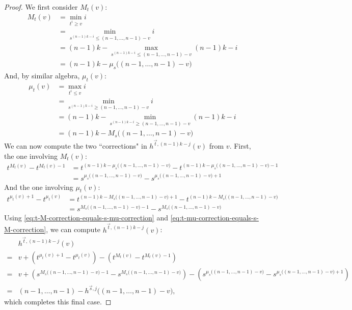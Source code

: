 \documentclass[11pt]{article}
\begin{document}
\begin{proof}
    We first consider $M_t(v)$:
    \begin{align}
        M_t(v) &= \min_{t^i \geq v} i \\
        &= \min_{s^{(n-1)k-i} \leq (n-1, \ldots, n-1) - v} i \\
        &= (n-1)k - \max_{s^{(n-1)k - i} \leq (n-1, \ldots, n-1) - v} (n-1)k - i \\
        &= (n-1)k - \mu_s\bigl((n-1, \ldots, n-1) - v\bigr)
    \end{align}
    And, by similar algebra, $\mu_t(v)$:
    \begin{align}
        \mu_t(v) &= \max_{t^i \leq v} i \\
        &= \min_{s^{(n-1)k-i} \geq (n-1, \ldots, n-1) - v} i \\
        &= (n-1)k - \min_{s^{(n-1)k - i} \geq (n-1, \ldots, n-1) - v} (n-1)k - i \\
        &= (n-1)k - M_s\bigl((n-1, \ldots, n-1) - v\bigr)
    \end{align}
    We can now compute the two ``corrections" in $h^{\vec{t}, (n-1)k-j}(v)$ from $v$. First, the one involving $M_t(v)$:
    \begin{align}
        t^{M_t(v)} - t^{M_t(v)-1} &= t^{(n-1)k - \mu_s\bigl((n-1, \ldots, n-1) - v\bigr)} - t^{(n-1)k - \mu_s\bigl((n-1, \ldots, n-1) - v\bigr) - 1} \\
        &= s^{\mu_s\bigl((n-1, \ldots, n-1) - v\bigr)} - s^{\mu_s\bigl((n-1, \ldots, n-1) - v\bigr) + 1} \label{eq:t-M-correction-equals-s-mu-correction}
    \end{align}
    And the one involving $\mu_t(v)$:
    \begin{align}
        t^{\mu_t(v) + 1} - t^{\mu_t(v)} &= t^{(n-1)k - M_s\bigl((n-1, \ldots, n-1) - v\bigr) + 1} - t^{(n-1)k - M_s\bigl((n-1, \ldots, n-1) - v\bigr)} \\
        &= s^{M_s\bigl((n-1, \ldots, n-1) - v\bigr) - 1} - s^{M_s\bigl((n-1, \ldots, n-1) - v\bigr)} \label{eq:t-mu-correction-equals-s-M-correction}
    \end{align}
    Using \eqref{eq:t-M-correction-equals-s-mu-correction} and \eqref{eq:t-mu-correction-equals-s-M-correction}, we can compute $h^{\vec{t}, (n-1)k-j}(v)$:
    \begin{align}
        &h^{\vec{t}, (n-1)k-j}(v) \\
        = &v + \left(t^{\mu_t(v) + 1} - t^{\mu_t(v)}\right) - \left(t^{M_t(v)} - t^{M_t(v)-1}\right) \\
        =& v + \left(s^{M_s\bigl((n-1, \ldots, n-1) - v\bigr) - 1} - s^{M_s\bigl((n-1, \ldots, n-1) - v\bigr)}\right) - \left(s^{\mu_s\bigl((n-1, \ldots, n-1) - v\bigr)} - s^{\mu_s\bigl((n-1, \ldots, n-1) - v\bigr) + 1}\right) \\
        =& (n-1, \ldots, n-1) - h^{\vec{s}, j}\bigl( (n-1, \ldots, n-1) - v\bigr),
    \end{align}
    which completes this final case.
\end{proof}
\end{document}
